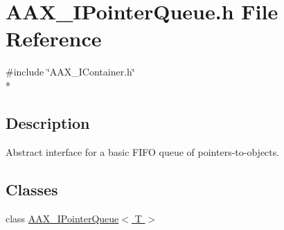 \hypertarget{a00258}{}\section{A\+A\+X\+\_\+\+I\+Pointer\+Queue.\+h File Reference}
\label{a00258}
{\ttfamily \#include \char`\"{}A\+A\+X\+\_\+\+I\+Container.\+h\char`\"{}}\\*


\subsection{Description}
Abstract interface for a basic F\+I\+F\+O queue of pointers-\/to-\/objects. 

\subsection*{Classes}
\begin{DoxyCompactItemize}
\item 
class \hyperlink{a00110}{A\+A\+X\+\_\+\+I\+Pointer\+Queue$<$ T $>$}
\end{DoxyCompactItemize}
